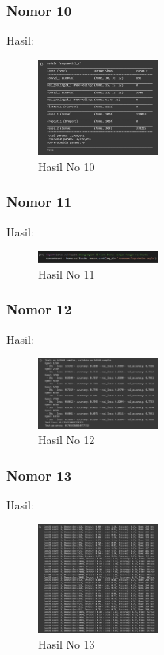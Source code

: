 \subsubsection{Nomor 10}
\hfill\break

Hasil:
\begin{figure}[H]
\centering
	\includegraphics[width=4cm]{figures/1174057/chapter7/no10.jpg}
	\caption{Hasil No 10}
\end{figure}

\subsubsection{Nomor 11}
\hfill\break

Hasil:
\begin{figure}[H]
\centering
	\includegraphics[width=4cm]{figures/1174057/chapter7/no11.jpg}
	\caption{Hasil No 11}
\end{figure}

\subsubsection{Nomor 12}
\hfill\break

Hasil:
\begin{figure}[H]
\centering
	\includegraphics[width=4cm]{figures/1174057/chapter7/no12.jpg}
	\caption{Hasil No 12}
\end{figure}

\subsubsection{Nomor 13}
\hfill\break

Hasil:
\begin{figure}[H]
\centering
	\includegraphics[width=4cm]{figures/1174057/chapter7/no13.jpg}
	\caption{Hasil No 13}
\end{figure}


